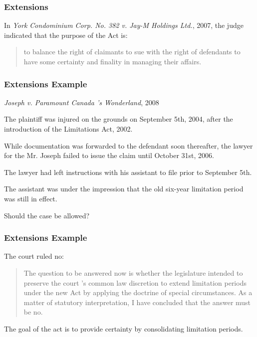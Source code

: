 \begin{frame}
\frametitle{Extensions}

In \textit{York Condominium Corp. No. 382 v. Jay-M Holdings Ltd.}, 2007, the judge indicated that the purpose of the Act is:


\begin{quote}
   to balance the right of claimants to sue with the right of defendants to have some certainty and finality in managing their affairs.
\end{quote}


\end{frame}



\begin{frame}
\frametitle{Extensions Example}

\textit{Joseph v. Paramount Canada 's Wonderland}, 2008

The plaintiff was injured on the grounds on September 5th, 2004, after the introduction of the Limitations Act, 2002.

While documentation was forwarded to the defendant soon thereafter, the lawyer for the Mr. Joseph failed to issue the claim until October 31st, 2006.

The lawyer had left instructions with his assistant to file prior to September 5th.

The assistant was under the impression that the old six-year limitation period was still in effect.

Should the case be allowed?

\end{frame}



\begin{frame}
\frametitle{Extensions Example}

The court ruled no:

\begin{quote}
The question to be answered now is whether the legislature intended to preserve the court 's common law discretion to extend limitation periods under the new Act by applying the doctrine of special circumstances. As a matter of statutory interpretation, I have concluded that the answer must be no.
\end{quote}

The goal of the act is to provide certainty by consolidating limitation periods.

\end{frame}






